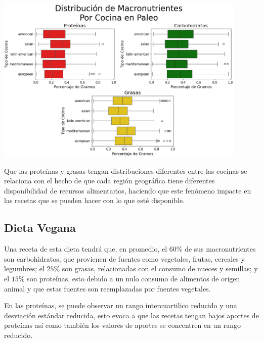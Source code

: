 \documentclass[12pt,a4paper]{article}
\begin{document}
{{{            \begin{center}
                \includegraphics[width=0.9\textwidth]{Resources/EDA/Paleo_2.png}
            \end{center}

            Que las proteínas y grasas tengan distribuciones diferentes entre 
            las cocinas se relaciona con el hecho de que cada región geográfica 
            tiene diferentes disponibilidad de recursos alimentarios, haciendo que 
            este fenómeno impacte en las recetas que se pueden hacer con lo que 
            esté disponible.
            }

            \subsection{Dieta Vegana}\label{anexo:C_vegan}
            {
            Una receta de esta dieta tendrá que, en promedio, el $60\%$ de 
            sus macronutrientes son carbohidratos, que provienen de fuentes 
            como vegetales, frutas, cereales y legumbres; el $25\%$ son grasas, 
            relacionadas con el consumo de nueces y semillas; y el $15\%$ son 
            proteínas, esto debido a un nulo consumo de alimentos de origen 
            animal y que estas fuentes son reemplazadas por fuentes vegetales.\newline

            En las proteínas, se puede observar un rango intercuartilico reducido y una 
            desviación estándar reducida, esto evoca a que las recetas tengan bajos 
            aportes de proteínas así como también los valores de aportes se concentren 
            en un rango reducido.\newline

}}}
\end{document}
